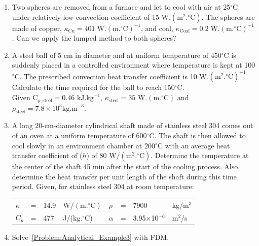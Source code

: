 \documentclass[12pts,a4paper,amsmath,amssymb,floatfix]{article}%
\begin{document}
\begin{enumerate}[label=\bfseries Problem \arabic*:]

\item\label{Problem:Lumped_Example1} Two spheres are removed from a furnace and let to cool with air at 25$^{\circ}$C under relatively low convection coefficient of 15 W.$\left(\text{m}^{2}.^{\circ}\text{C}\right)$. The spheres are made of copper,  $\kappa_{\text{Cu}}=401\;\text{W.}\left(\text{m.}^{\circ}\text{C}\right)^{-1}$, and coal, $\kappa_{\text{Coal}}=0.2\;\text{W.}\left(\text{m.}^{\circ}\text{C}\right)^{-1}$. Can we apply the lumped method to both spheres?
\item\label{Problem:Lumped_Example2}A steel ball of 5 cm in diameter and at uniform temperature of 450$^{\circ}$C is suddenly placed in a controlled environment where temperature is kept at 100$^{\circ}$C.  The prescribed convection heat transfer coefficient is 10 W.$\left(\text{m}^{2}.^{\circ}\text{C}\right)^{-1}$. Calculate the time required for the ball to reach 150$^{\circ}$C. \\
Given C$_{p,\text{steel}} = 0.46\text{ kJ.kg}^{-1}$, $\kappa_{\text{steel}}=35\text{ W.}\left(\text{m.}^{\circ}\text{C}\right)$ and $\rho_{\text{steel}}=7.8\times 10^{3}\text{kg.m}^{-3}$.
\item\label{Problem:Analytical_Example3} A long 20-cm-diameter cylindrical shaft made of stainless steel 304 comes out of an oven at a uniform temperature of 600$^{\circ}$C. The shaft is then allowed to cool slowly in an environment chamber at 200$^{\circ}$C with an average heat transfer coefficient of ($h$) of 80 W/$\left(\text{m}^{2}.^{\circ}\text{C}\right)$. Determine the temperature at the center of the shaft 45 min after the start of the cooling process. Also, determine the heat transfer per unit length of the shaft during this time period. Given, for stainless steel 304 at room temperature: 
\begin{center}
   \begin{tabular}{|l c l l | l c l l |}
     \hline
       $\kappa$ & = & 14.9 & W/$\left(\text{m.}^{\circ}\text{C}\right)$ & $\rho$   & = & 7900 & kg/m$^{3}$ \\
       $C_{p}$   & = & 477 & J/(kg.$^{\circ}$C)                          & $\alpha$ & = & 3.95$\times$10$^{-6}$ & m$^{2}$/s \\
     \hline
   \end{tabular}
\end{center}

\item\label{Problem:Analytical_Example4} Solve~\ref{Problem:Analytical_Example3} with FDM.


\end{enumerate}
\end{document}

